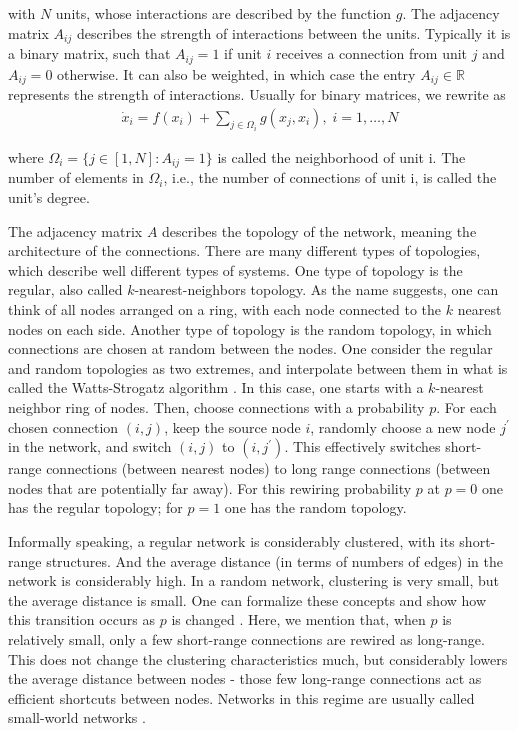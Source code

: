 with $N$ units, whose interactions are described by the function $g$. The adjacency matrix $A_{ij}$ describes the strength of interactions between the units. Typically it is a binary matrix, such that $A_{ij} = 1$ if unit $i$ receives a connection from unit $j$ and $A_{ij} = 0$ otherwise. It can also be weighted, in which case the entry $A_{ij} \in \mathbb{R}$ represents the strength of interactions. Usually for binary matrices, we rewrite  as 
%
\begin{align}
    \dot{x}_i = f(x_i) + \sum_{j \in \Omega_i} g(x_j, x_i),\; i=1,\ldots,N
    \label{eq:network-general-neighborhood}
\end{align} 

where $\Omega_i = \{j \in [1, N]: A_{ij} = 1\}$ is called the neighborhood of unit i. The number of elements in $\Omega_i$, i.e., the number of connections of unit i, is called the unit's degree.

The adjacency matrix $A$ describes the topology of the network, meaning the architecture of the connections. There are many different types of topologies, which describe well different types of systems. One type of topology is the regular, also called $k$-nearest-neighbors topology. As the name suggests, one can think of all nodes arranged on a ring, with each node connected to the $k$ nearest nodes on each side. Another type of topology is the random topology, in which connections are chosen at random between the nodes. One consider the regular and random topologies as two extremes, and interpolate between them in what is called the Watts-Strogatz algorithm \cite{watts1998collective}. In this case, one starts with a $k$-nearest neighbor ring of nodes. Then, choose connections with a probability $p$. For each chosen connection $(i,j)$, keep the source node $i$, randomly choose a new node $j^\prime$ in the network, and switch $(i,j)$ to $(i,j^\prime)$. This effectively switches short-range connections (between nearest nodes) to long range connections (between nodes that are potentially far away). For this rewiring probability $p$ at $p=0$ one has the regular topology; for $p=1$ one has the random topology. 

Informally speaking, a regular network is considerably clustered, with its short-range structures. And the average distance (in terms of numbers of edges) in the network is considerably high. In a random network, clustering is very small, but the average distance is small. One can formalize these concepts and show how this transition occurs as $p$ is changed \cite{watts1998collective}. Here, we mention that, when $p$ is relatively small, only a few short-range connections are rewired as long-range. This does not change the clustering characteristics much, but considerably lowers the average distance between nodes - those few long-range connections act as efficient shortcuts between nodes. Networks in this regime are usually called small-world networks \cite{watts1998collective}. 

